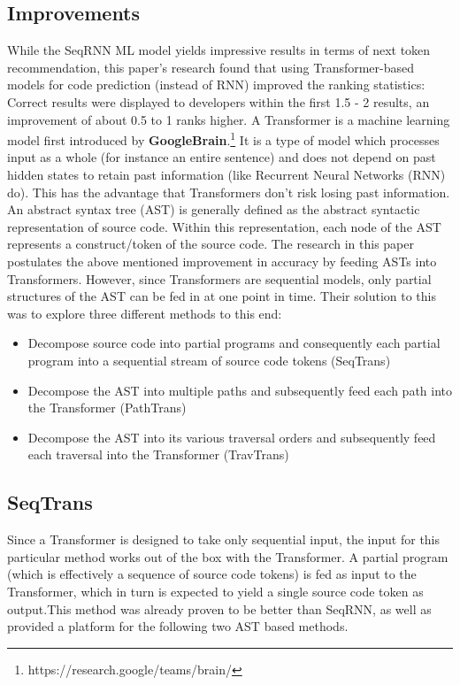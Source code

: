 \documentclass[sigplan,screen,9pt]{acmart}
\begin{document}
    \subsection{Improvements}
    While the SeqRNN ML model yields impressive results in terms of next token recommendation, this paper's research found that using Transformer-based models for code prediction (instead of RNN) improved the ranking statistics: Correct results were displayed to developers within the first 1.5 - 2 results, an improvement of about 0.5 to 1 ranks higher.\cite{FeedTree}
    \newline
    A Transformer is a machine learning model first introduced by \textbf{GoogleBrain}.\footnote{https://research.google/teams/brain/} It is a type of model which processes input as a whole (for instance an entire sentence) and does not depend on past hidden states to retain past information (like Recurrent Neural Networks (RNN) do).\cite{vaswani2017attention} This has the advantage that Transformers don't risk losing past information.
    \newline
    An abstract syntax tree (AST) is generally defined as the abstract syntactic representation of source code.\cite{AST} Within this representation, each node of the AST represents a construct/token of the source code. The research in this paper postulates the above mentioned improvement in accuracy by feeding ASTs into Transformers. However, since Transformers are sequential models, only partial structures of the AST can be fed in at one point in time. Their solution to this was to explore three different methods to this end:\cite{FeedTree}
    \begin{itemize}
        \item Decompose source code into partial programs and consequently each partial program into a sequential stream of source code tokens (SeqTrans)
        \item Decompose the AST into multiple paths and subsequently feed each path into the Transformer (PathTrans)
        \item Decompose the AST into its various traversal orders and subsequently feed each traversal into the Transformer (TravTrans)
    \end{itemize}

    \subsection{SeqTrans}
    Since a Transformer is designed to take only sequential input, the input for this particular method works out of the box with the Transformer. A partial program (which is effectively a sequence of source code tokens) is fed as input to the Transformer, which in turn is expected to yield a single source code token as output.This method was already proven to be better than SeqRNN, as well as provided a platform for the following two AST based methods.
\end{document}
